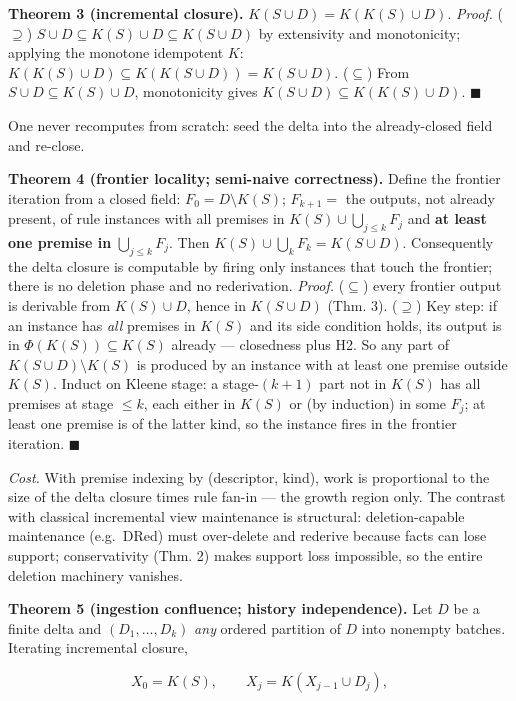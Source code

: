 \documentclass[
  10pt,
]{article}
\begin{document}
\textbf{Theorem 3 (incremental closure).}
\(K(S \cup D) = K(K(S) \cup D)\). \emph{Proof.} (\(\supseteq\))
\(S \cup D \subseteq K(S) \cup D \subseteq K(S \cup D)\) by extensivity
and monotonicity; applying the monotone idempotent \(K\):
\(K(K(S) \cup D) \subseteq K(K(S \cup D)) = K(S \cup D)\).
(\(\subseteq\)) From \(S \cup D \subseteq K(S) \cup D\), monotonicity
gives \(K(S \cup D) \subseteq K(K(S) \cup D)\). \(\blacksquare\)

One never recomputes from scratch: seed the delta into the
already-closed field and re-close.

\textbf{Theorem 4 (frontier locality; semi-naive correctness).} Define
the frontier iteration from a closed field: \(F_0 = D \setminus K(S)\);
\(F_{k+1} =\) the outputs, not already present, of rule instances with
all premises in \(K(S) \cup \bigcup_{j \le k} F_j\) and \textbf{at least
one premise in} \(\bigcup_{j\le k} F_j\). Then
\(K(S) \cup \bigcup_k F_k = K(S \cup D)\). Consequently the delta
closure is computable by firing only instances that touch the frontier;
there is no deletion phase and no rederivation. \emph{Proof.}
(\(\subseteq\)) every frontier output is derivable from \(K(S)\cup D\),
hence in \(K(S\cup D)\) (Thm. 3). (\(\supseteq\)) Key step: if an
instance has \emph{all} premises in \(K(S)\) and its side condition
holds, its output is in \(\Phi(K(S)) \subseteq K(S)\) already ---
closedness plus H2. So any part of \(K(S\cup D)\setminus K(S)\) is
produced by an instance with at least one premise outside \(K(S)\).
Induct on Kleene stage: a stage-\((k{+}1)\) part not in \(K(S)\) has all
premises at stage \(\le k\), each either in \(K(S)\) or (by induction)
in some \(F_j\); at least one premise is of the latter kind, so the
instance fires in the frontier iteration. \(\blacksquare\)

\emph{Cost.} With premise indexing by (descriptor, kind), work is
proportional to the size of the delta closure times rule fan-in --- the
growth region only. The contrast with classical incremental view
maintenance is structural: deletion-capable maintenance (e.g.~DRed) must
over-delete and rederive because facts can lose support; conservativity
(Thm. 2) makes support loss impossible, so the entire deletion machinery
vanishes.

\textbf{Theorem 5 (ingestion confluence; history independence).} Let
\(D\) be a finite delta and \((D_1, \dots, D_k)\) \emph{any} ordered
partition of \(D\) into nonempty batches. Iterating incremental closure,

\[X_0 = K(S), \qquad X_j = K(X_{j-1} \cup D_j),\]
\end{document}
